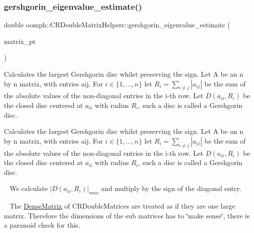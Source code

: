 \mbox{\label{namespaceoomph_1_1CRDoubleMatrixHelpers_ac7abb3c0163ba84dbf12eb5a0240a59c}} 
\subsubsection{\texorpdfstring{gershgorin\+\_\+eigenvalue\+\_\+estimate()}{gershgorin\_eigenvalue\_estimate()}}
{\footnotesize\ttfamily double oomph\+::\+C\+R\+Double\+Matrix\+Helpers\+::gershgorin\+\_\+eigenvalue\+\_\+estimate (\begin{DoxyParamCaption}\item[{const \hyperlink{classoomph_1_1DenseMatrix}{Dense\+Matrix}$<$ \hyperlink{classoomph_1_1CRDoubleMatrix}{C\+R\+Double\+Matrix} $\ast$$>$ \&}]{matrix\+\_\+pt }\end{DoxyParamCaption})}



Calculates the largest Gershgorin disc whilst preserving the sign. Let A be an n by n matrix, with entries aij. For $ i \in \{ 1,...,n \} $ let $ R_i = \sum_{i\neq j} |a_{ij}| $ be the sum of the absolute values of the non-\/diagonal entries in the i-\/th row. Let $ D(a_{ii},R_i) $ be the closed disc centered at $ a_{ii} $ with radius $ R_i $, such a disc is called a Gershgorin disc. 

Calculates the largest Gershgorin disc whilst preserving the sign. Let A be an n by n matrix, with entries aij. For $ i \in \{ 1,...,n \} $ let $ R_i = \sum_{i\neq j}|a_{ij}| $ be the sum of the absolute values of the non-\/diagonal entries in the i-\/th row. Let $ D(a_{ii},R_i) $ be the closed disc centered at $ a_{ii} $ with radius $ R_i $, such a disc is called a Gershgorin disc.

~\newline
 We calculate $ |D(a_{ii},R_i)|_{max} $ and multiply by the sign of the diagonal entry.

~\newline
 The \hyperlink{classoomph_1_1DenseMatrix}{Dense\+Matrix} of C\+R\+Double\+Matrices are treated as if they are one large matrix. Therefore the dimensions of the sub matrices has to \char`\"{}make sense\char`\"{}, there is a paranoid check for this.

